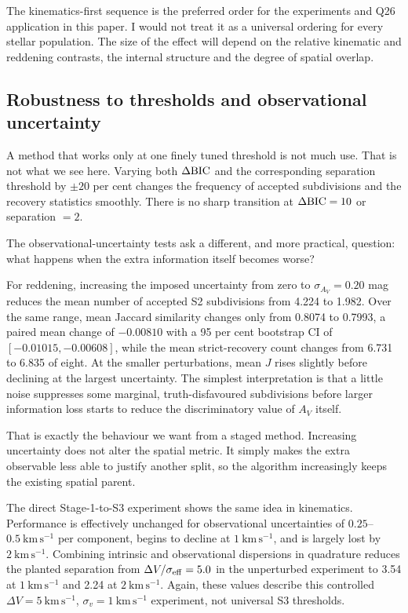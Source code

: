 \documentclass[fleqn,usenatbib]{rasti}
\begin{document}
The kinematics-first sequence is the preferred order for the experiments and Q26 application in this paper. I would not treat it as a universal ordering for every stellar population. The size of the effect will depend on the relative kinematic and reddening contrasts, the internal structure and the degree of spatial overlap.

\subsection{Robustness to thresholds and observational uncertainty}

A method that works only at one finely tuned threshold is not much use. That is not what we see here. Varying both $\Delta{\rm BIC}$ and the corresponding separation threshold by $\pm20$ per cent changes the frequency of accepted subdivisions and the recovery statistics smoothly. There is no sharp transition at $\Delta{\rm BIC}=10$ or separation $=2$.

The observational-uncertainty tests ask a different, and more practical, question: what happens when the extra information itself becomes worse?

For reddening, increasing the imposed uncertainty from zero to $\sigma_{A_V}=0.20$ mag reduces the mean number of accepted S2 subdivisions from 4.224 to 1.982. Over the same range, mean Jaccard similarity changes only from 0.8074 to 0.7993, a paired mean change of $-0.00810$ with a 95 per cent bootstrap CI of $[-0.01015,-0.00608]$, while the mean strict-recovery count changes from 6.731 to 6.835 of eight. At the smaller perturbations, mean $J$ rises slightly before declining at the largest uncertainty. The simplest interpretation is that a little noise suppresses some marginal, truth-disfavoured subdivisions before larger information loss starts to reduce the discriminatory value of $A_V$ itself.

That is exactly the behaviour we want from a staged method. Increasing uncertainty does not alter the spatial metric. It simply makes the extra observable less able to justify another split, so the algorithm increasingly keeps the existing spatial parent.

The direct Stage-1-to-S3 experiment shows the same idea in kinematics. Performance is effectively unchanged for observational uncertainties of $0.25$--$0.5~\mathrm{km\,s^{-1}}$ per component, begins to decline at $1~\mathrm{km\,s^{-1}}$, and is largely lost by $2~\mathrm{km\,s^{-1}}$. Combining intrinsic and observational dispersions in quadrature reduces the planted separation from $\Delta V/\sigma_{\rm eff}=5.0$ in the unperturbed experiment to 3.54 at $1~\mathrm{km\,s^{-1}}$ and 2.24 at $2~\mathrm{km\,s^{-1}}$. Again, these values describe this controlled $\Delta V=5~\mathrm{km\,s^{-1}}$, $\sigma_v=1~\mathrm{km\,s^{-1}}$ experiment, not universal S3 thresholds.
\end{document}
